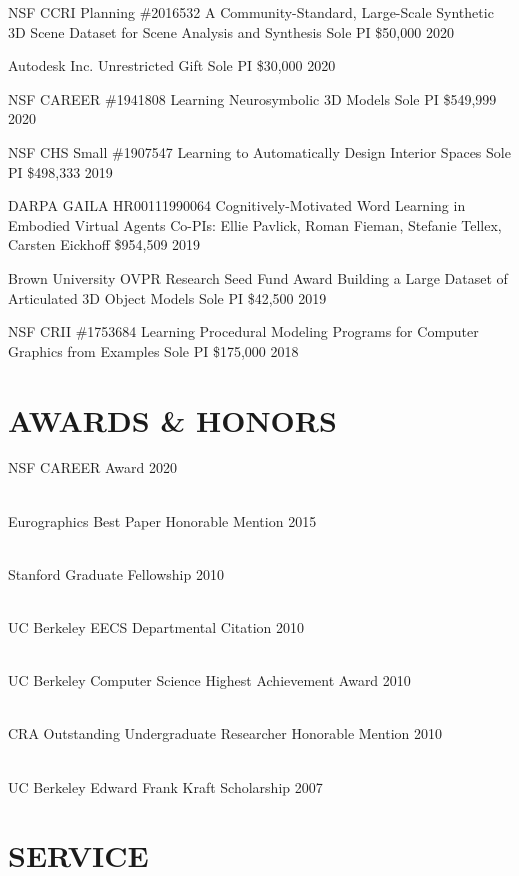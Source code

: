 \documentclass[line,margin]{res}
\begin{document}
\begin{resume}
\funding
{NSF CCRI Planning \#2016532}
{A Community-Standard, Large-Scale Synthetic 3D Scene Dataset for Scene Analysis and Synthesis}
{Sole PI}
{\$50,000}
{2020}

\funding
{Autodesk Inc.}
{Unrestricted Gift}
{Sole PI}
{\$30,000}
{2020}

\funding
{NSF CAREER \#1941808}
{Learning Neurosymbolic 3D Models}
{Sole PI}
{\$549,999}
{2020}

\funding
{NSF CHS Small \#1907547}
{Learning to Automatically Design Interior Spaces}
{Sole PI}
{\$498,333}
{2019}

\funding
{DARPA GAILA HR00111990064}
{Cognitively-Motivated Word Learning in Embodied Virtual Agents}
{Co-PIs: Ellie Pavlick, Roman Fieman, Stefanie Tellex, Carsten Eickhoff}
{\$954,509}
{2019}

\funding
{Brown University OVPR Research Seed Fund Award}
{Building a Large Dataset of Articulated 3D Object Models}
{Sole PI}
{\$42,500}
{2019}

\funding
{NSF CRII \#1753684}
{Learning Procedural Modeling Programs for Computer Graphics from Examples}
{Sole PI}
{\$175,000}
{2018}


\section{AWARDS \& HONORS}

\newcommand{\award}[2] {
	#1 \hfill #2
}

\award
{NSF CAREER Award}
{2020}
\\
\award
{Eurographics Best Paper Honorable Mention}
{2015}
\\
\award
{Stanford Graduate Fellowship}
{2010}
\\
\award
{UC Berkeley EECS Departmental Citation}
{2010}
\\
\award
{UC Berkeley Computer Science Highest Achievement Award}
{2010}
\\
\award
{CRA Outstanding Undergraduate Researcher Honorable Mention}
{2010}
\\
\award
{UC Berkeley Edward Frank Kraft Scholarship}
{2007}


\section{SERVICE}


\end{resume}
\end{document}
